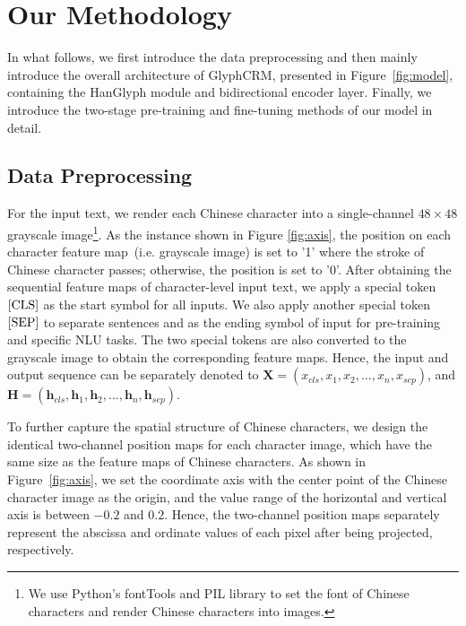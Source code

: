 \section{Our Methodology}


In what follows, we first introduce the data preprocessing and then mainly introduce the overall architecture of GlyphCRM, presented in Figure~\ref{fig:model}, containing the HanGlyph module and bidirectional encoder layer. Finally, we introduce the two-stage pre-training and fine-tuning methods of our model in detail.


\subsection{Data Preprocessing}
For the input text, we render each Chinese character into a single-channel $ 48\times48$ grayscale image\footnote{We use Python's fontTools and PIL library to set the font of Chinese characters and render Chinese characters into images.}. As the instance shown in Figure \ref{fig:axis}, the position on each character feature map~(i.e. grayscale image) is set to '1' where the stroke of Chinese character passes; otherwise, the position is set to '0'. After obtaining the sequential feature maps of character-level input text, we apply a special token $\rm[CLS]$ as the start symbol for all inputs. We also apply another special token $\rm[SEP]$ to separate sentences and as the ending symbol of input for pre-training and specific NLU tasks. The two special tokens are also converted to the grayscale image to obtain the corresponding feature maps. Hence, the input and output sequence can be separately denoted to $\mathbf{X} = (x_{cls}, x_1, x_2, ..., x_n, x_{sep})$, and $\mathbf{H} = (\mathbf{h}_{cls}, \mathbf{h}_1, \mathbf{h}_2, ..., \mathbf{h}_n, \mathbf{h}_{sep})$. 


To further capture the spatial structure of Chinese characters, we design the identical two-channel position maps for each character image, which have the same size as the feature maps of Chinese characters. As shown in Figure~\ref{fig:axis}, we set the coordinate axis with the center point of the Chinese character image as the origin, and the value range of the horizontal and vertical axis is between $-0.2$ and $0.2$. Hence, the two-channel position maps separately represent the abscissa and ordinate values of each pixel after being projected, respectively. 



